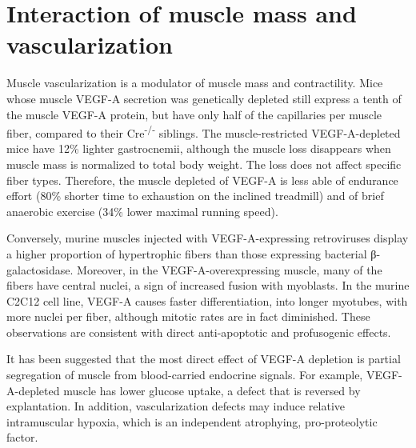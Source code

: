 \documentclass[12pt,english]{report}\usepackage[]{graphicx}\usepackage[]{color}
\begin{document}
\section{Interaction of muscle mass and vascularization}

Muscle vascularization is a modulator of muscle mass and contractility.
Mice whose muscle VEGF-A secretion was genetically depleted still
express a tenth of the muscle VEGF-A protein, but have only half of
the capillaries per muscle fiber, compared to their Cre\textsuperscript{-/-}
siblings\citep{olfert2009muscle-specific}. The muscle-restricted
VEGF-A-depleted mice have 12\% lighter gastrocnemii, although the
muscle loss disappears when muscle mass is normalized to total body
weight. The loss does not affect specific fiber types. Therefore,
the muscle depleted of VEGF-A is less able of endurance effort (80\%
shorter time to exhaustion on the inclined treadmill) and of brief
anaerobic exercise (34\% lower maximal running speed).

Conversely, murine muscles injected with VEGF-A-expressing retroviruses
display a higher proportion of hypertrophic fibers than those expressing
bacterial β-galactosidase\citep{arsic2004vascular}. Moreover, in
the VEGF-A-overexpressing muscle, many of the fibers have central
nuclei, a sign of increased fusion with myoblasts. In the murine C2C12
cell line, VEGF-A causes faster differentiation, into longer myotubes,
with more nuclei per fiber, although mitotic rates are in fact diminished.
These observations are consistent with direct anti-apoptotic and profusogenic
effects.

It has been suggested that the most direct effect of VEGF-A depletion
is partial segregation of muscle from blood-carried endocrine signals.
For example, VEGF-A-depleted muscle has lower glucose uptake, a defect
that is reversed by explantation\citep{bonner2013muscle-specific}.
In addition, vascularization defects may induce relative intramuscular
hypoxia, which is an independent atrophying, pro-proteolytic factor\citep{detheije2015differential}.
\end{document}
